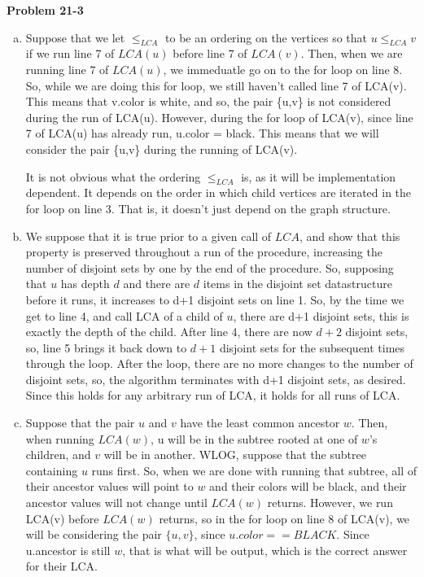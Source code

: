 \documentclass{article}
\begin{document}
\noindent\textbf{Problem 21-3}\\
\begin{enumerate}[a.]
\item

Suppose that we let $\le_{LCA}$ to be an ordering on the vertices so that $u\le_{LCA} v$ if we run line 7 of $LCA(u)$ before line 7 of $LCA(v)$. Then, when we are running line 7 of $LCA(u)$, we immeduatle go on to the for loop on line 8. So, while we are doing this for loop, we still haven't called line 7 of LCA(v). This means that v.color is white, and so, the pair \{u,v\} is not considered during the run of LCA(u). However, during the for loop of LCA(v), since line 7 of LCA(u) has already run, u.color = black. This means that we will consider the pair \{u,v\} during the running of LCA(v).

It is not obvious what the ordering $\le_{LCA}$ is, as it will be implementation dependent. It depends on the order in which child vertices are iterated in the for loop on line 3. That is, it doesn't just depend on the graph structure.

\item
We suppose that it is true prior to a given call of $LCA$, and show that this property is preserved throughout a run of the procedure, increasing the number of disjoint sets by one by the end of the procedure. So, supposing that $u$ has depth $d$ and there are $d$ items in the disjoint set datastructure before it runs, it increases to d+1 disjoint sets on line 1. So, by the time we get to line 4, and call LCA of a child of $u$, there are d+1 disjoint sets, this is exactly the depth of the child. After line 4, there are now $d+2$ disjoint sets, so, line 5 brings it back down to $d+1$ disjoint sets for the subsequent times through the loop. After the loop, there are no more changes to the number of disjoint sets, so, the algorithm terminates with d+1 disjoint sets, as desired. Since this holds for any arbitrary run of LCA, it holds for all runs of LCA.

\item
Suppose that the pair $u$ and $v$ have the least common ancestor $w$. Then, when running $LCA(w)$, u will be in the subtree rooted at one of $w$'s children, and $v$ will be in another. WLOG, suppose that the subtree containing $u$ runs first. So, when we are done with running that subtree, all of their ancestor values will point to $w$ and their colors will be black, and their ancestor values will not change until $LCA(w)$ returns. However, we run LCA(v) before $LCA(w)$ returns, so in the for loop on line 8 of LCA(v), we will be considering the pair $\{u,v\}$, since $u.color==BLACK$. Since u.ancestor is still $w$, that is what will be output, which is the correct answer for their LCA.


\end{enumerate}
\end{document}
